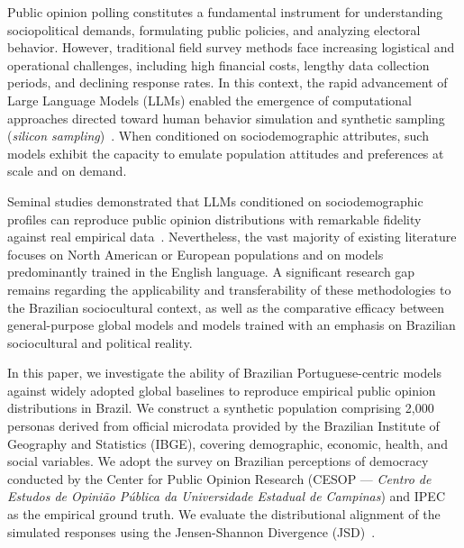Public opinion polling constitutes a fundamental instrument for understanding
sociopolitical demands, formulating public policies, and analyzing electoral
behavior. However, traditional field survey methods face increasing logistical
and operational challenges, including high financial costs, lengthy data
collection periods, and declining response rates. In this context, the rapid
advancement of Large Language Models (LLMs) enabled the emergence of
computational approaches directed toward human behavior simulation and synthetic
sampling (\textit{silicon sampling})~\cite{argyle_out_2023}. When conditioned on
sociodemographic attributes, such models exhibit the capacity to emulate
population attitudes and preferences at scale and on demand.

Seminal studies demonstrated that LLMs conditioned on sociodemographic profiles
can reproduce public opinion distributions with remarkable fidelity against real
empirical data~\cite{argyle_out_2023,miranda_simulating_2025}. Nevertheless, the
vast majority of existing literature focuses on North American or European
populations and on models predominantly trained in the English language. A
significant research gap remains regarding the applicability and
transferability of these methodologies to the Brazilian sociocultural context,
as well as the comparative efficacy between general-purpose global models and
models trained with an emphasis on Brazilian sociocultural and political reality.

In this paper, we investigate the ability of Brazilian Portuguese-centric
models against widely adopted global baselines to reproduce empirical public
opinion distributions in Brazil. We construct a
synthetic population comprising 2,000 personas derived from official microdata
provided by the Brazilian Institute of Geography and Statistics (IBGE),
covering demographic, economic, health, and social variables. We adopt the
survey on Brazilian perceptions of democracy conducted by the Center for Public
Opinion Research (CESOP --- \textit{Centro de Estudos de Opinião Pública da
Universidade Estadual de Campinas}) and IPEC~\cite{cesop04832} as the empirical
ground truth. We evaluate the distributional
alignment of the simulated responses using the Jensen-Shannon Divergence
(JSD)~\cite{lin_divergence_1991}.

